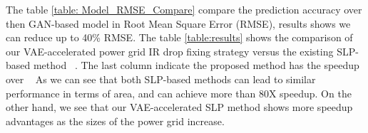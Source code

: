 \begin{table}[h]
	\begin{center} %
		\caption{ Comparison of the proposed VAE-accelerated SLP optimization method against the existing method}
		\label{table:results}
		\center
	\end{center}
	\vspace{-0.1in}
\end{table}
      The table \ref{table: Model_RMSE_Compare}  compare the prediction accuracy over then GAN-based model in Root Mean Square Error (RMSE), results shows we can reduce up to 40\% RMSE. 
      The table \ref{table:results} shows the comparison of our VAE-accelerated power grid IR drop fixing strategy versus the existing SLP-based method~\cite{Sukharev:2019pg} . The last column indicate
      the proposed method has the speedup over ~\cite{Sukharev:2019pg}
      As we can see that both SLP-based
      methods can lead to similar performance in terms of area,  and can achieve more than 80X speedup.  On the other hand, we see that our VAE-accelerated SLP method shows more speedup advantages as the sizes of the power grid increase.
      








